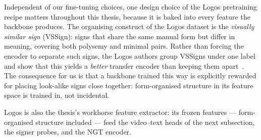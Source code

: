 Independent of our fine-tuning choices, one design choice of the Logos
pretraining recipe matters throughout this thesis, because it is baked
into every feature the backbone produces. The organising construct of
the Logos dataset is the
\emph{visually similar sign} (VSSign): signs that share the same manual
form but differ in meaning, covering both polysemy and minimal pairs.
Rather than forcing the encoder to separate such signs, the Logos authors
group VSSigns under one label and show that this yields a \emph{better}
transfer encoder than keeping them apart~\cite{ovodovLogosWellTemperedPretrain2025}.
The consequence for us is that a backbone trained this way is explicitly
rewarded for placing look-alike signs close together: form-organised
structure in its feature space is trained in, not incidental.

Logos is also the thesis's workhorse feature extractor: its frozen
features --- form-organised structure included --- feed the video--text
heads of the next subsection, the signer probes, and the NGT encoder.

